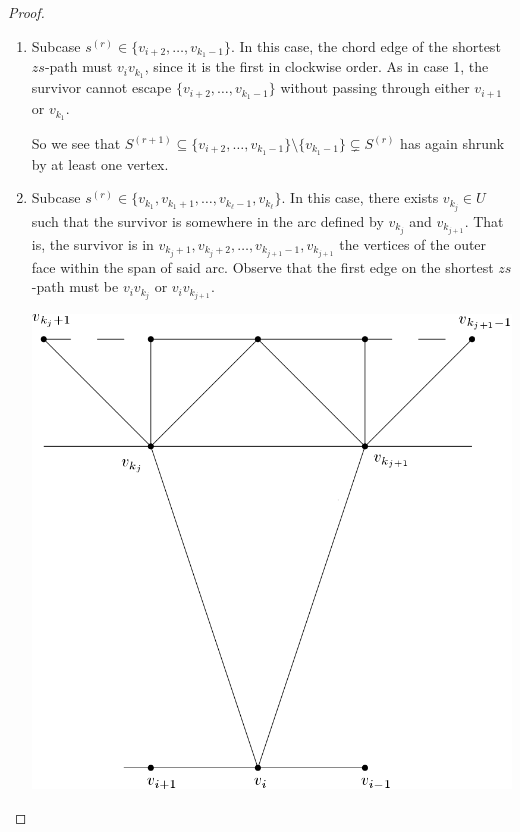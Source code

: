 \documentclass[letterpaper, 10pt]{article}
\begin{document}
\begin{proof}
\begin{enumerate}
    \begin{enumerate}
      \item Subcase $s^{(r)} \in \{v_{i+2}, \dots, v_{k_1 -1} \}$. In this case, the
      chord edge of the shortest $zs$-path must $v_i v_{k_1}$, since it is the first in clockwise order.
      As in case 1, the survivor cannot escape $\{v_{i+2}, \dots, v_{k_1 -1} \}$ without passing through
      either $v_{i+1}$ or $v_{k_1}$.

      So we see that $S^{(r+1)} \subseteq \{v_{i+2}, \dots, v_{k_1 -1 }\} \setminus \{v_{k_1-1}\} \subsetneq S^{(r)}$
       has again shrunk by at least one vertex.

      \item Subcase $s^{(r)} \in \{v_{k_1}, v_{k_1 +1}, \dots, v_{k_\ell -1}, v_{k_\ell}\}$.
      In this case, there exists $v_{k_j} \in U$ such that
      the survivor is somewhere in the arc defined by $v_{k_j}$ and $v_{k_{j +1}}$.
      That is, the survivor is in $v_{k_j +1}, v_{k_j + 2}, \dots, v_{k_{j+1} -1}, v_{k_{j+1}}$ the vertices of
      the outer face within the span of said arc.
      Observe that the first edge on the shortest $zs$-path must be $v_iv_{k_j}$ or $v_iv_{k_{j +1}}$.

      \begin{center}
      \includegraphics[scale=0.25]{survivor_zone_round_r+1_case_2b}
      \end{center}


\end{enumerate}
\end{enumerate}
\end{proof}
\end{document}
